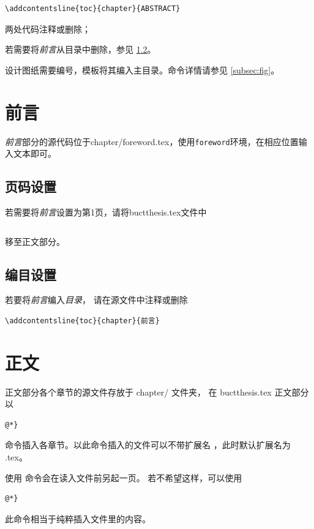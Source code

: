 	\begin{lstlisting}[numbers=none]
\addcontentsline{toc}{chapter}{ABSTRACT}
	\end{lstlisting}
    两处代码注释或删除；
    
    若需要将\emph{前言}从目录中删除，参见 \ref{subsec:fwtoc}。

    设计图纸需要编号，模板将其编入主目录。命令详情请参见 \ref{subsec:fig}。
    
    
\section{前言}\label{sec:foreword}
	\emph{前言}部分的源代码位于\textsf{chapter/foreword.tex}，使用\texttt{foreword}环境，在相应位置输入文本即可。
    \subsection{页码设置}\label{subsec:fwpage}
    若需要将\emph{前言}设置为第1页，请将\textsf{buctthesis.tex}文件中

    \begin{lstlisting}[firstnumber=45]

    \end{lstlisting}
    移至正文部分。
    \subsection{编目设置}\label{subsec:fwtoc}
    若要将\emph{前言}编入\emph{目录}，
    请在源文件中注释或删除
    \begin{lstlisting}[firstnumber=3]
\addcontentsline{toc}{chapter}{前言}
    \end{lstlisting}


\section{正文}
    正文部分各个章节的源文件存放于 \textsf{chapter/} 文件夹，
    在 \textsf{buctthesis.tex} 正文部分以

    \begin{lstlisting}[numbers=none]
@*}
    \end{lstlisting}
    命令插入各章节。以此命令插入的文件可以不带扩展名
    ，此时默认扩展名为 \textsf{.tex}。

    使用  命令会在读入文件前另起一页。
    若不希望这样，可以使用
    \begin{lstlisting}[numbers=none]
@*}
    \end{lstlisting}
    此命令相当于纯粹插入文件里的内容。

